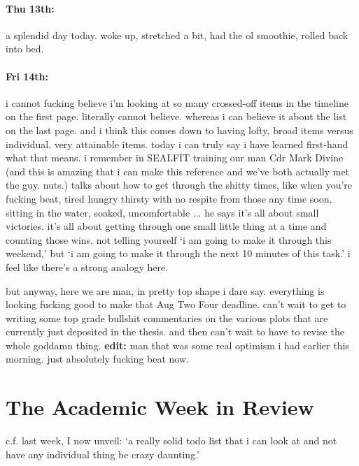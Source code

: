 \documentclass[12pt]{article}
\begin{document}
\paragraph{Thu 13th:} a splendid day today. woke up, stretched a bit, had the ol smoothie, rolled back into bed.

\paragraph{Fri 14th:} i cannot fucking believe i'm looking at so many crossed-off items in the timeline on the first page. literally cannot believe. whereas i can believe it about the list on the last page. and i think this comes down to having lofty, broad items versus individual, very attainable items. today i can truly say i have learned first-hand what that means. i remember in SEALFIT training our man Cdr Mark Divine (and this is amazing that i can make this reference and we've both actually met the guy. nuts.) talks about how to get through the shitty times, like when you're fucking beat, tired hungry thirsty with no respite from those any time soon, sitting in the water, soaked, uncomfortable ... he says it's all about small victories. it's all about getting through one small little thing at a time and counting those wins. not telling yourself `i am going to make it through this weekend,' but `i am going to make it through the next 10 minutes of this task.' i feel like there's a strong analogy here. \par 
but anyway, here we are man, in pretty top shape i dare say. everything is looking fucking good to make that Aug Two Four deadline. can't wait to get to writing some top grade bullshit commentaries on the various plots that are currently just deposited in the thesis. and then can't wait to have to revise the whole goddamn thing. {\bf edit:} man that was some real optimism i had earlier this morning. just absolutely fucking beat now.

\section*{The Academic Week in Review}
c.f. last week, I now unveil: `a really solid todo list that i can look at and not have any individual thing be crazy daunting.'

\clearpage 
\end{document}
